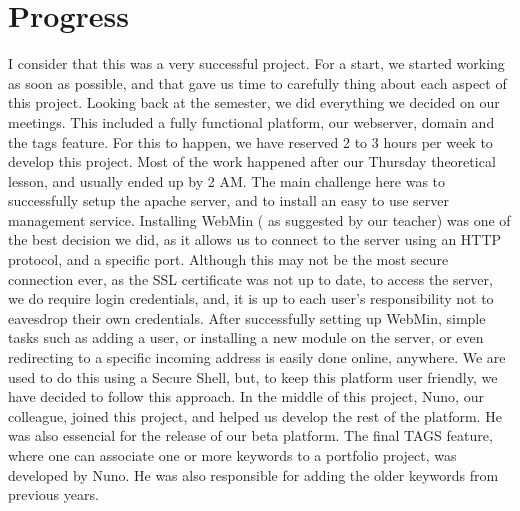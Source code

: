 \documentclass[a4paper,12pt,journal,twoside,compsoc]{PPIEEEtran}
\begin{document}
\section{Progress}
I consider that this was a very successful project. For a start, we started working as soon as possible, and that gave us time to carefully thing about each aspect of this project. Looking back at the semester, we did everything we decided on our meetings. This included a fully functional platform, our webserver, domain and the tags feature.
	For this to happen, we have reserved 2 to 3 hours per week to develop this project. Most of the work happened after our Thursday theoretical lesson, and usually ended up by 2 AM.
	The main challenge here was to successfully setup the apache server, and to install an easy to use server management service. Installing WebMin ( as suggested by our teacher) was one of the best decision we did, as it allows us to connect to the server using an HTTP protocol, and a specific port. Although this may not be the most secure connection ever, as the SSL certificate was not up to date, to access the server, we do require login credentials, and, it is up to each user's responsibility not to eavesdrop their own credentials.
	After successfully setting up WebMin, simple tasks such as adding a user, or installing a new module on the server, or even redirecting to a specific incoming address is easily done online, anywhere. We are used to do this using a Secure Shell, but, to keep this platform user friendly, we have decided to follow this approach.
	In the middle of this project, Nuno, our colleague, joined this project, and helped us develop the rest of the platform. He was also essencial for the release of our beta platform. The final TAGS feature, where one can associate one or more keywords to a portfolio project, was developed by Nuno. He was also responsible for adding the older keywords from previous years.
	
\end{document}
